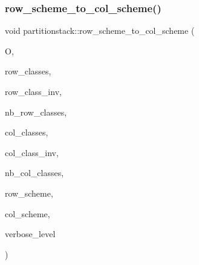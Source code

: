 \mbox{\label{classpartitionstack_a24d8ed194c925e236d16d5bb15091e73}} 
\subsubsection{\texorpdfstring{row\+\_\+scheme\+\_\+to\+\_\+col\+\_\+scheme()}{row\_scheme\_to\_col\_scheme()}}
{\footnotesize\ttfamily void partitionstack\+::row\+\_\+scheme\+\_\+to\+\_\+col\+\_\+scheme (\begin{DoxyParamCaption}\item[{\mbox{\hyperlink{classorthogonal}{orthogonal}} \&}]{O,  }\item[{\mbox{\hyperlink{galois_8h_a09fddde158a3a20bd2dcadb609de11dc}{I\+NT}} $\ast$}]{row\+\_\+classes,  }\item[{\mbox{\hyperlink{galois_8h_a09fddde158a3a20bd2dcadb609de11dc}{I\+NT}} $\ast$}]{row\+\_\+class\+\_\+inv,  }\item[{\mbox{\hyperlink{galois_8h_a09fddde158a3a20bd2dcadb609de11dc}{I\+NT}}}]{nb\+\_\+row\+\_\+classes,  }\item[{\mbox{\hyperlink{galois_8h_a09fddde158a3a20bd2dcadb609de11dc}{I\+NT}} $\ast$}]{col\+\_\+classes,  }\item[{\mbox{\hyperlink{galois_8h_a09fddde158a3a20bd2dcadb609de11dc}{I\+NT}} $\ast$}]{col\+\_\+class\+\_\+inv,  }\item[{\mbox{\hyperlink{galois_8h_a09fddde158a3a20bd2dcadb609de11dc}{I\+NT}}}]{nb\+\_\+col\+\_\+classes,  }\item[{\mbox{\hyperlink{galois_8h_a09fddde158a3a20bd2dcadb609de11dc}{I\+NT}} $\ast$}]{row\+\_\+scheme,  }\item[{\mbox{\hyperlink{galois_8h_a09fddde158a3a20bd2dcadb609de11dc}{I\+NT}} $\ast$}]{col\+\_\+scheme,  }\item[{\mbox{\hyperlink{galois_8h_a09fddde158a3a20bd2dcadb609de11dc}{I\+NT}}}]{verbose\+\_\+level }\end{DoxyParamCaption})}

\mbox{\label{classpartitionstack_a1fee7aeec20edf677bbc3cd175d1e9e5}} 
